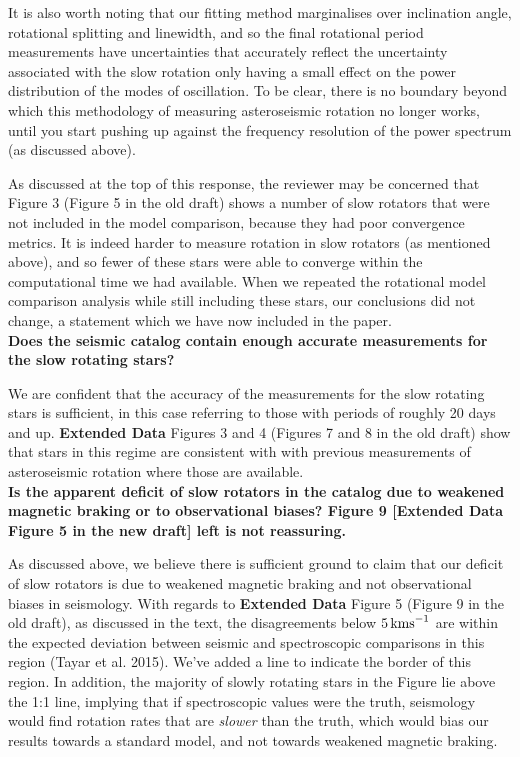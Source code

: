 \documentclass[11pt]{article}
\begin{document}
It is also worth noting that our fitting method marginalises over inclination angle, rotational splitting and linewidth, and so the final rotational period measurements have uncertainties that accurately reflect the uncertainty associated with the slow rotation only having a small effect on the power distribution of the modes of oscillation. To be clear, there is no boundary beyond which this methodology of measuring asteroseismic rotation no longer works, until you start pushing up against the frequency resolution of the power spectrum (as discussed above).

As discussed at the top of this response, the reviewer may be concerned that Figure 3 (Figure 5 in the old draft) shows  a number of slow rotators that were not included in the model comparison, because they had poor convergence metrics. It is indeed harder to measure rotation in slow rotators (as mentioned above), and so fewer of these stars were able to converge within the computational time we had available. When we repeated the rotational model comparison analysis while still including these stars, our conclusions did not change, a statement which we have now included in the paper.\\

\noindent\textbf{Does the seismic catalog contain enough accurate measurements for the slow rotating stars?}

We are confident that the accuracy of the measurements for the slow rotating stars is sufficient, in this case referring to those with periods of roughly 20 days and up. \textbf{Extended Data} Figures 3 and 4 (Figures 7 and 8 in the old draft) show that stars in this regime are consistent with with previous measurements of asteroseismic rotation where those are available.\\

\noindent\textbf{Is the apparent deficit of slow rotators in the catalog due to weakened magnetic braking or to observational biases? Figure 9 [\textbf{Extended Data} Figure 5 in the new draft] left is not reassuring.}

As discussed above, we believe there is sufficient ground to claim that our deficit of slow rotators is due to weakened magnetic braking and not observational biases in seismology. With regards to \textbf{Extended Data} Figure 5 (Figure 9 in the old draft), as discussed in the text, the disagreements below $5\,  \rm{kms}^{-1}$ are within the expected deviation between seismic and spectroscopic comparisons in this region (Tayar et al. 2015). We’ve added a line to indicate the border of this region. In addition, the majority of slowly rotating stars in the Figure lie above the 1:1 line, implying that if spectroscopic values were the truth, seismology would find rotation rates that are \textit{slower} than the truth, which would bias our results towards a standard model, and not towards weakened magnetic braking.
\end{document}
